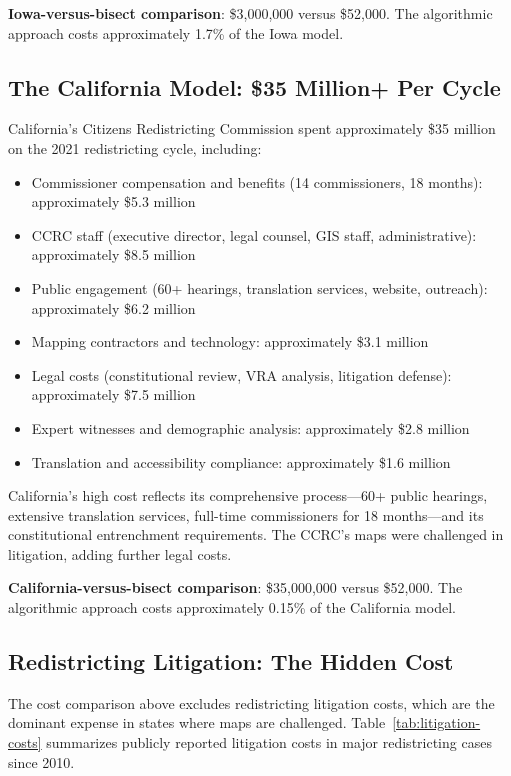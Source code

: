 \textbf{Iowa-versus-bisect comparison}: \$3,000,000 versus \$52,000. The algorithmic approach costs approximately 1.7\% of the Iowa model.

\subsection{The California Model: \$35 Million+ Per Cycle}

California's Citizens Redistricting Commission spent approximately \$35 million on the 2021 redistricting cycle, including:

\begin{itemize}
  \item Commissioner compensation and benefits (14 commissioners, 18 months): approximately \$5.3 million
  \item CCRC staff (executive director, legal counsel, GIS staff, administrative): approximately \$8.5 million
  \item Public engagement (60+ hearings, translation services, website, outreach): approximately \$6.2 million
  \item Mapping contractors and technology: approximately \$3.1 million
  \item Legal costs (constitutional review, VRA analysis, litigation defense): approximately \$7.5 million
  \item Expert witnesses and demographic analysis: approximately \$2.8 million
  \item Translation and accessibility compliance: approximately \$1.6 million
\end{itemize}

California's high cost reflects its comprehensive process---60+ public hearings, extensive translation services, full-time commissioners for 18 months---and its constitutional entrenchment requirements. The CCRC's maps were challenged in litigation, adding further legal costs.

\textbf{California-versus-bisect comparison}: \$35,000,000 versus \$52,000. The algorithmic approach costs approximately 0.15\% of the California model.

\subsection{Redistricting Litigation: The Hidden Cost}

The cost comparison above excludes redistricting litigation costs, which are the dominant expense in states where maps are challenged. Table~\ref{tab:litigation-costs} summarizes publicly reported litigation costs in major redistricting cases since 2010.

